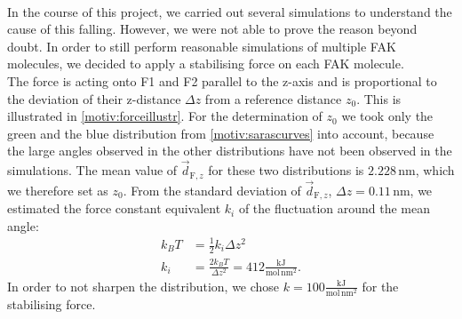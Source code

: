 \\
In the course of this project, we carried out several simulations to understand the cause of this falling. However, we were not able to prove the reason beyond doubt. In order to still perform reasonable simulations of multiple FAK molecules, we decided to apply a stabilising force on each FAK molecule.\\
The force is acting onto F1 and F2 parallel to the z-axis and is proportional to the deviation of their z-distance $\Delta z$ from a reference distance $z_0$. This is illustrated in \autoref{motiv:forceillustr}. For the determination of $z_0$ we took only the green and the blue distribution from \autoref{motiv:sarascurves} into account, because the large angles observed in the other distributions have not been observed in the \charmm{} simulations. The mean value of $\vec{d}_{\text{F}, z}$ for these two distributions is $2.228\,\si{\nano\metre}$, which we therefore set as $z_0$. From the standard deviation of $\vec{d}_{\text{F}, z}$, $\Delta z = 0.11\,\si{\nano\metre}$, we estimated the force constant equivalent $k_i$ of the fluctuation around the mean angle:
\begin{align}
	k_B T &= \frac{1}{2} k_i \Delta z^2\\
	k_i &= \frac{2 k_B T}{\Delta z^2} = 412 \frac{\si{\kilo\joule}}{\si{\mole}\,\si{\nano\metre}^2}.
\end{align}
In order to not sharpen the distribution, we chose $k = 100 \frac{\si{\kilo\joule}}{\si{\mole}\,\si{\nano\metre}^2}$ for the stabilising force.
%
%
%
